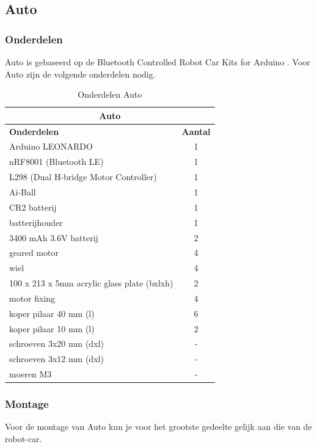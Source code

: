 \documentclass[12pt,a4paper]{article}
\begin{document}
\newpage
\subsection{Auto}
\subsubsection{Onderdelen}
Auto is gebaseerd op de Bluetooth Controlled Robot Car Kits for Arduino \cite{DIY_auto}. Voor Auto zijn de volgende onderdelen nodig. 

\begin{table}[!h]	
	\begin{tabular}{|l|c|}
		\hline \multicolumn{2}{|c|}{\textbf{Auto}}	\\	
		\hline \textbf{Onderdelen} & \textbf{Aantal} \\ 
		\hline Arduino LEONARDO & 1 \\ 
		\hline  nRF8001 (Bluetooth LE) & 1  \\ 
		\hline	L298 (Dual H-bridge Motor Controller) & 1 \\
		\hline Ai-Ball & 1 \\
		\hline  CR2 batterij & 1 \\
		\hline  batterijhouder & 1  \\ 
		\hline 3400 mAh 3.6V batterij & 2 \\ 
		\hline  geared motor & 4 \\
		\hline  wiel	 & 4 \\
		\hline 	100 x 213 x 5mm acrylic glass plate (bxlxh) & 2 \\
		\hline  motor fixing & 4 \\
		\hline	koper pilaar 40 mm (l) & 6 \\
		\hline 	koper pilaar 10 mm (l) & 2 \\
		\hline 	schroeven 3x20 mm (dxl) & - \\
		\hline	schroeven 3x12 mm (dxl) & - \\
		\hline  moeren M3 & - \\	
		\hline
	\end{tabular} 
	\caption{Onderdelen Auto}
	\label{tbl:Onderdelen_auto}
\end{table}
	
\subsubsection{Montage}
Voor de montage van Auto kun je voor het grootste gedeelte gelijk aan die van de robot-car.
\end{document}
